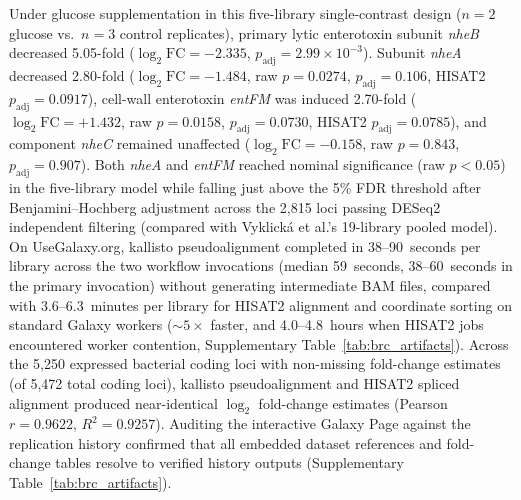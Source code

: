 \documentclass[11pt,letterpaper]{article}
\newcommand{\tool}[1]{\textsf{#1}}
\begin{document}
Under glucose supplementation in this five-library single-contrast design ($n = 2$ glucose vs.\ $n = 3$ control replicates), primary lytic enterotoxin subunit \textit{nheB} decreased 5.05-fold ($\log_2\text{FC} = -2.335$, $p_{\text{adj}} = 2.99 \times 10^{-3}$). Subunit \textit{nheA} decreased 2.80-fold ($\log_2\text{FC} = -1.484$, raw $p = 0.0274$, $p_{\text{adj}} = 0.106$, \tool{HISAT2} $p_{\text{adj}} = 0.0917$), cell-wall enterotoxin \textit{entFM} was induced 2.70-fold ($\log_2\text{FC} = +1.432$, raw $p = 0.0158$, $p_{\text{adj}} = 0.0730$, \tool{HISAT2} $p_{\text{adj}} = 0.0785$), and component \textit{nheC} remained unaffected ($\log_2\text{FC} = -0.158$, raw $p = 0.843$, $p_{\text{adj}} = 0.907$). Both \textit{nheA} and \textit{entFM} reached nominal significance (raw $p < 0.05$) in the five-library model while falling just above the 5\% FDR threshold after Benjamini--Hochberg adjustment across the 2,815 loci passing \tool{DESeq2} independent filtering (compared with Vyklick{\'a} et al.'s 19-library pooled model). On UseGalaxy.org, \tool{kallisto} pseudoalignment completed in 38--90~seconds per library across the two workflow invocations (median 59~seconds, 38--60~seconds in the primary invocation) without generating intermediate BAM files, compared with 3.6--6.3~minutes per library for \tool{HISAT2} alignment and coordinate sorting on standard Galaxy workers ($\sim 5\times$ faster, and 4.0--4.8~hours when \tool{HISAT2} jobs encountered worker contention, Supplementary Table~\ref{tab:brc_artifacts}). Across the 5,250 expressed bacterial coding loci with non-missing fold-change estimates (of 5,472 total coding loci), \tool{kallisto} pseudoalignment and \tool{HISAT2} spliced alignment produced near-identical $\log_2$ fold-change estimates (Pearson $r = 0.9622$, $R^2 = 0.9257$). Auditing the interactive Galaxy Page against the replication history confirmed that all embedded dataset references and fold-change tables resolve to verified history outputs (Supplementary Table~\ref{tab:brc_artifacts}).
\end{document}
